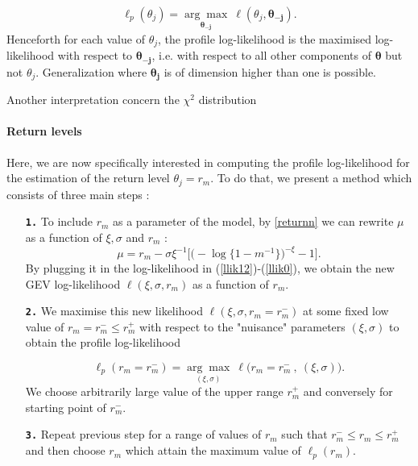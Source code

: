 \documentclass[11pt,a4paper,openany ]{book}
\begin{document}
\begin{equation}
\ell_p(\theta_j)=\underset{\boldsymbol{\theta_{-j}}}{\mathrm{\arg\max}}\ \ell (\theta_j,\boldsymbol{\theta_{-j}}).
\end{equation}
Henceforth for each value of $\theta_j$, the profile log-likelihood is the maximised 
log-likelihood with respect to $\boldsymbol{\theta_{-j}}$, i.e. with respect to all other 
components of $\boldsymbol{\theta}$ but not $\theta_j$.
Generalization where $\boldsymbol{\theta_j}$ is of dimension higher than one is possible.

Another interpretation concern the $\chi^2$ distribution

\paragraph*{Return levels} Here, we are now specifically interested in computing the profile log-likelihood
for the estimation of the return level $\theta_j=r_m$. To do that, we present a method which consists of three main steps :

\begin{enumerate}[label=\textbf{\arabic*})]
	
	\item[\textbf{\texttt{1.}}]  To include $r_m$ as a parameter of the model, by \ref{returnn} we can rewrite $\mu$ as a function of $\xi,\sigma$ and $r_m$ :
	\begin{equation*}
	\mu= r_m-\sigma\xi^{-1}\Big[\Big(-\log\{1-m^{-1}\}\Big)^{-\xi}-1\Big].
	\end{equation*}
	By plugging it in the log-likelihood in (\ref{llik12})-(\ref{llik0}), we obtain the new GEV log-likelihood $\ell(\xi,\sigma,r_m)$ as a function of $r_m$.
	
	\item[\textbf{\texttt{2.}}]   We maximise this new likelihood $\ell (\xi,\sigma,r_m=r^{-}_{m})$ at some fixed low value of $r_m=r^{-}_{m}\leq r^{+}_{m}$ with respect to the "nuisance" parameters $(\xi,\sigma)$ to obtain the profile log-likelihood
	
	\begin{equation*}
	\ell_p(r_m=r^{-}_{m})=\underset{(\xi,\sigma)}{\mathrm{\arg\max}}\ \ell \Big(r_m=r^{-}_{m}\ ,\ (\xi,\sigma)\Big).
	\end{equation*} 
	We choose arbitrarily large value of the upper range $r^{+}_m$ and conversely for starting point of $r^{-}_m$.
	
	\item[\textbf{\texttt{3.}}]  Repeat previous step for a range of values of $r_m$ such that $r^{-}_{m}\leq r_m\leq r^{+}_{m}$ and then choose $r_m$ which attain the maximum value of $\ell_p(r_m)$.
\end{enumerate}
\end{document}
